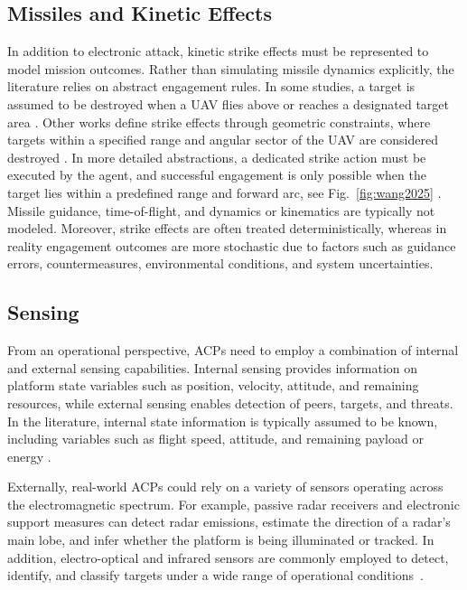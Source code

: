 \subsection{Missiles and Kinetic Effects}
In addition to electronic attack, kinetic strike effects must be represented to model mission outcomes. Rather than simulating missile dynamics explicitly, the literature relies on abstract engagement rules. In some studies, a target is assumed to be destroyed when a UAV flies above or reaches a designated target area \cite{yuksek2021cooperative}. Other works define strike effects through geometric constraints, where targets within a specified range and angular sector of the UAV are considered destroyed \cite{Wang2025CooperativeUAV,yue2022uav_sead_hmarl}. In more detailed abstractions, a dedicated strike action must be executed by the agent, and successful engagement is only possible when the target lies within a predefined range and forward arc, see Fig.~\ref{fig:wang2025} \cite{Lee2023MUMTSEAD}. Missile guidance, time-of-flight, and dynamics or kinematics are typically not modeled. Moreover, strike effects are often treated deterministically, whereas in reality engagement outcomes are more stochastic due to factors such as guidance errors, countermeasures, environmental conditions, and system uncertainties.

\subsection{Sensing} 
From an operational perspective, ACPs need to employ a combination of internal and external sensing capabilities. Internal sensing provides information on platform state variables such as position, velocity, attitude, and remaining resources, while external sensing enables detection of peers, targets, and threats. In the literature, internal state information is typically assumed to be known, including variables such as flight speed, attitude, and remaining payload or energy \cite{xu2025mdrl_uav_combat,Lee2023MUMTSEAD}.

Externally, real-world ACPs could rely on a variety of sensors operating across the electromagnetic spectrum. For example, passive radar receivers and electronic support measures can detect radar emissions, estimate the direction of a radar’s main lobe, and infer whether the platform is being illuminated or tracked. In addition, electro-optical and infrared sensors are commonly employed to detect, identify, and classify targets under a wide range of operational conditions~\cite{von_spreckelsen2018_ew_forgotten, AFDP3_85_2023, Adamy2001EW101, gunzinger2024cca, RadarTutorial_Jamming}.

